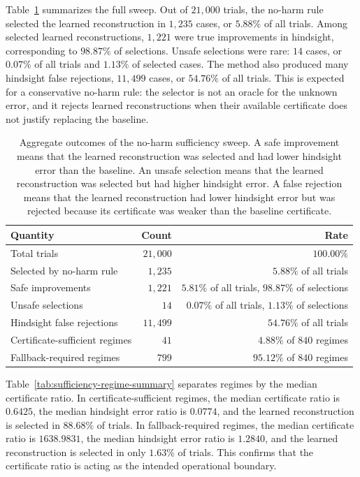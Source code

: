 \documentclass{article}
\numberwithin{equation}{section}
\theoremstyle{definition}
\begin{document}
Table~\ref{tab:sufficiency-aggregate-outcomes} summarizes the full sweep. Out of \(21{,}000\) trials, the no-harm rule selected the learned reconstruction in \(1{,}235\) cases, or \(5.88\%\) of all trials. Among selected learned reconstructions, \(1{,}221\) were true improvements in hindsight, corresponding to \(98.87\%\) of selections. Unsafe selections were rare: \(14\) cases, or \(0.07\%\) of all trials and \(1.13\%\) of selected cases. The method also produced many hindsight false rejections, \(11{,}499\) cases, or \(54.76\%\) of all trials. This is expected for a conservative no-harm rule: the selector is not an oracle for the unknown error, and it rejects learned reconstructions when their available certificate does not justify replacing the baseline.

\begin{table}[!ht]
\centering
\caption{Aggregate outcomes of the no-harm sufficiency sweep. A safe improvement means that the learned reconstruction was selected and had lower hindsight error than the baseline. An unsafe selection means that the learned reconstruction was selected but had higher hindsight error. A false rejection means that the learned reconstruction had lower hindsight error but was rejected because its certificate was weaker than the baseline certificate.}
\label{tab:sufficiency-aggregate-outcomes}
\begin{tabular}{lrr}
	\toprule
	\textbf{Quantity} & \textbf{Count} & \textbf{Rate} \\
	\midrule
	Total trials & \(21{,}000\) & \(100.00\%\) \\
	Selected by no-harm rule & \(1{,}235\) & \(5.88\%\) of all trials \\
	Safe improvements & \(1{,}221\) & \(5.81\%\) of all trials, \(98.87\%\) of selections \\
	Unsafe selections & \(14\) & \(0.07\%\) of all trials, \(1.13\%\) of selections \\
	Hindsight false rejections & \(11{,}499\) & \(54.76\%\) of all trials \\
	Certificate-sufficient regimes & \(41\) & \(4.88\%\) of \(840\) regimes \\
	Fallback-required regimes & \(799\) & \(95.12\%\) of \(840\) regimes \\
	\bottomrule
\end{tabular}
\end{table}

Table~\ref{tab:sufficiency-regime-summary} separates regimes by the median certificate ratio. In certificate-sufficient regimes, the median certificate ratio is \(0.6425\), the median hindsight error ratio is \(0.0774\), and the learned reconstruction is selected in \(88.68\%\) of trials. In fallback-required regimes, the median certificate ratio is \(1638.9831\), the median hindsight error ratio is \(1.2840\), and the learned reconstruction is selected in only \(1.63\%\) of trials. This confirms that the certificate ratio is acting as the intended operational boundary.
\end{document}
